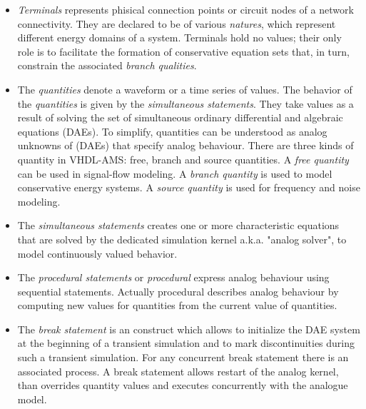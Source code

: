 \documentclass{article}
\begin{document}
\begin{itemize}
\item
\emph{Terminals} represents phisical connection points or circuit nodes
of a network connectivity. They are declared to be of various
\emph{natures}, which represent different energy domains of a system.
Terminals hold no values; their only role is to facilitate the formation
of conservative equation sets that, in turn, constrain the associated
\emph{branch qualities}.
\item
The \emph{quantities} denote a waveform or a time series of values.
The behavior of the \emph{quantities} is given by the \emph{simultaneous
 statements}. They take values as a result of solving the set of simultaneous
ordinary differential and algebraic equations (DAEs). To simplify,
quantities can be understood as analog unknowns of (DAEs) that specify
analog behaviour. There are three kinds of quantity in VHDL-AMS: free,
branch and source quantities. A \emph{free quantity} can be used in
signal-flow modeling. A \emph{branch quantity} is used to model conservative energy
systems. A \emph{source quantity} is used for frequency and noise modeling.
\item
The \emph{simultaneous statements} creates one or more characteristic
equations that are solved by the dedicated simulation kernel a.k.a.
"analog solver", to model continuously valued behavior. 
\item
The \emph{procedural statements} or \emph{procedural} express analog behaviour
using sequential statements. Actually procedural describes analog behaviour
by computing new values for quantities from the current value of quantities.
\item
The \emph{break statement} is an construct which allows to
initialize the DAE system at the beginning of a transient
simulation and to mark discontinuities during such a transient
simulation. For any concurrent break statement there is an associated process.
A break statement allows restart of the analog kernel,
than overrides quantity values and executes concurrently with the analogue model.

\end{itemize}
 
\end{document}
